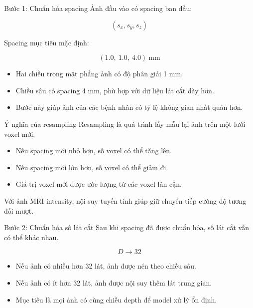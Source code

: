 \documentclass[aspectratio=169]{beamer}
\begin{document}
\begin{frame}{Bước 1: Chuẩn hóa spacing}
  Ảnh đầu vào có spacing ban đầu:

  \[
    (s_x, s_y, s_z)
  \]

  Spacing mục tiêu mặc định:

  \[
    (1.0,\ 1.0,\ 4.0)\ \text{mm}
  \]

  \begin{itemize}
    \item Hai chiều trong mặt phẳng ảnh có độ phân giải 1 mm.
    \item Chiều sâu có spacing 4 mm, phù hợp với dữ liệu lát cắt dày hơn.
    \item Bước này giúp ảnh của các bệnh nhân có tỷ lệ không gian nhất quán hơn.
  \end{itemize}
\end{frame}

\begin{frame}{Ý nghĩa của resampling}
  Resampling là quá trình lấy mẫu lại ảnh trên một lưới voxel mới.

  \begin{itemize}
    \item Nếu spacing mới nhỏ hơn, số voxel có thể tăng lên.
    \item Nếu spacing mới lớn hơn, số voxel có thể giảm đi.
    \item Giá trị voxel mới được ước lượng từ các voxel lân cận.
  \end{itemize}

  \vspace{0.3cm}
  Với ảnh MRI intensity, nội suy tuyến tính giúp giữ chuyển tiếp cường độ tương đối mượt.
\end{frame}

\begin{frame}{Bước 2: Chuẩn hóa số lát cắt}
  Sau khi spacing đã được chuẩn hóa, số lát cắt vẫn có thể khác nhau.

  \[
    D \rightarrow 32
  \]

  \begin{itemize}
    \item Nếu ảnh có nhiều hơn 32 lát, ảnh được nén theo chiều sâu.
    \item Nếu ảnh có ít hơn 32 lát, ảnh được nội suy thêm lát trung gian.
    \item Mục tiêu là mọi ảnh có cùng chiều depth để model xử lý ổn định.
  \end{itemize}
\end{frame}
\end{document}
